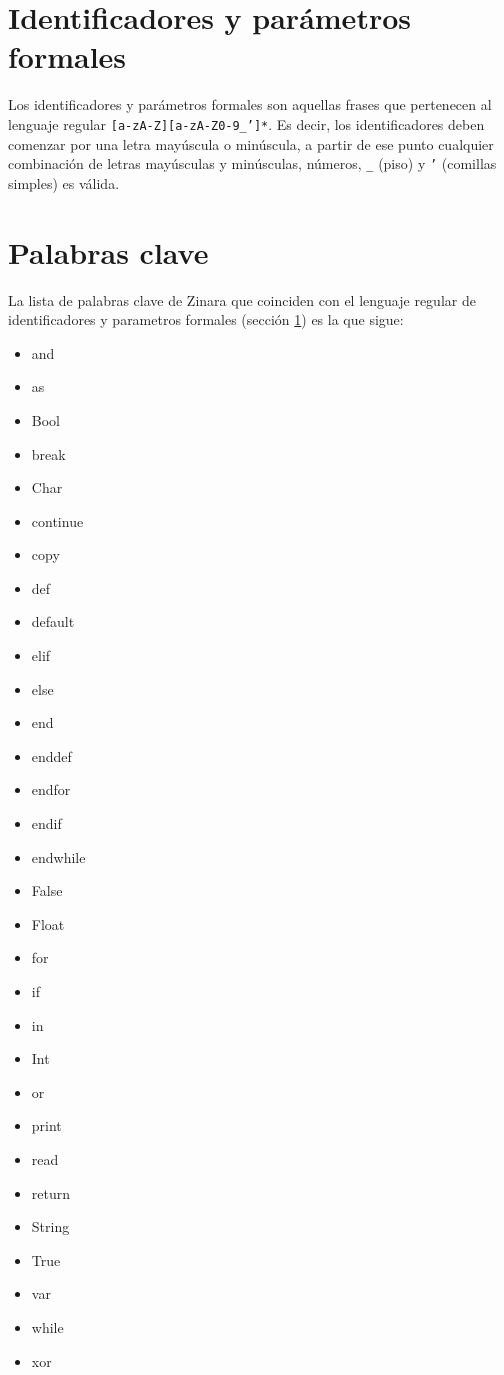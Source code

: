 \documentclass[12pt, spanish]{report}
\begin{document}
\section{Identificadores y par\'ametros formales}
\label{sec:ident}
Los identificadores y par\'ametros formales son aquellas frases que
pertenecen al lenguaje regular \texttt{[a-zA-Z][a-zA-Z0-9\_']*}. Es
decir, los identificadores deben comenzar por una letra may\'uscula o
min\'uscula, a partir de ese punto cualquier combinaci\'on de letras
may\'usculas y min\'usculas, n\'umeros, \texttt{\_} (piso) y
\texttt{'} (comillas simples) es v\'alida.

\section{Palabras clave}
\label{sec:keywords}
La lista de palabras clave de Zinara que coinciden con el lenguaje regular
de identificadores y parametros formales (secci\'on \ref{sec:ident}) es la que sigue:
\begin{itemize}
\item and
\item as
\item Bool
\item break
\item Char
\item continue
\item copy
\item def
\item default
\item elif
\item else
\item end
\item enddef
\item endfor
\item endif
\item endwhile
\item False
\item Float
\item for
\item if
\item in
\item Int
\item or
\item print
\item read
\item return
\item String
\item True
\item var
\item while
\item xor
\end{itemize}
\end{document}
